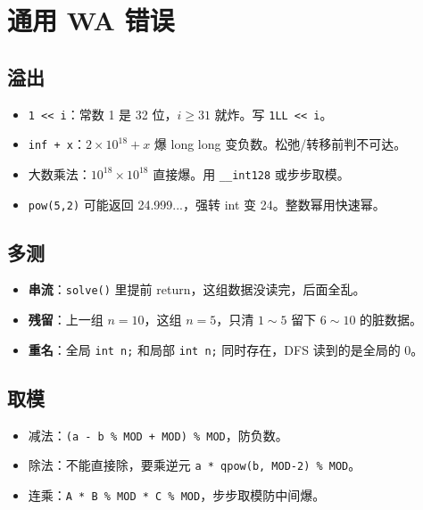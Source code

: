 \documentclass[UTF8,openany,oneside,zihao=-4]{ctexbook}
\begin{document}
\chapter{通用 WA 错误}

\section{溢出}

\begin{warn}
\begin{itemize}
  \item \texttt{1 << i}：常数 1 是 32 位，$i \ge 31$ 就炸。写 \texttt{1LL << i}。
  \item \texttt{inf + x}：$2 \times 10^{18} + x$ 爆 long long 变负数。松弛/转移前判不可达。
  \item 大数乘法：$10^{18} \times 10^{18}$ 直接爆。用 \texttt{\_\_int128} 或步步取模。
  \item \texttt{pow(5,2)} 可能返回 24.999...，强转 int 变 24。整数幂用快速幂。
\end{itemize}
\end{warn}

\section{多测}

\begin{warn}
\begin{itemize}
  \item \textbf{串流}：\lstinline|solve()| 里提前 return，这组数据没读完，后面全乱。
  \item \textbf{残留}：上一组 $n=10$，这组 $n=5$，只清 $1 \sim 5$ 留下 $6 \sim 10$ 的脏数据。
  \item \textbf{重名}：全局 \lstinline|int n;| 和局部 \lstinline|int n;| 同时存在，DFS 读到的是全局的 0。
\end{itemize}
\end{warn}

\section{取模}

\begin{itemize}
  \item 减法：\lstinline|(a - b % MOD + MOD) % MOD|，防负数。
  \item 除法：不能直接除，要乘逆元 \lstinline|a * qpow(b, MOD-2) % MOD|。
  \item 连乘：\lstinline|A * B % MOD * C % MOD|，步步取模防中间爆。
\end{itemize}
\end{document}
